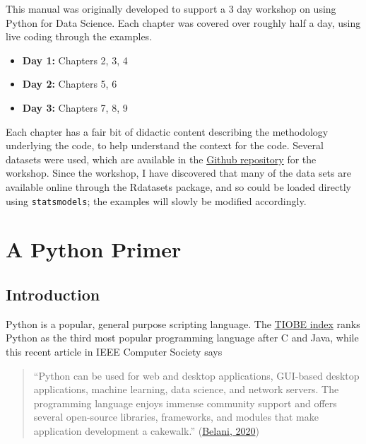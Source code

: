 \documentclass[
  letterpaper,
]{scrbook}
\providecommand{\tightlist}{%
  \setlength{\itemsep}{0pt}\setlength{\parskip}{0pt}}
\begin{document}
This manual was originally developed to support a 3 day workshop on using Python for Data Science. Each chapter was covered over roughly half a day, using live coding through the examples.

\begin{itemize}
\tightlist
\item
  \textbf{Day 1: } Chapters 2, 3, 4
\item
  \textbf{Day 2: } Chapters 5, 6
\item
  \textbf{Day 3: } Chapters 7, 8, 9
\end{itemize}

Each chapter has a fair bit of didactic content describing
the methodology underlying the code, to help understand the
context for the code. Several datasets were used, which are
available in the \href{https://www.github.com/araastat/BIOF085.git}{Github repository} for the workshop. Since the workshop, I have discovered that many
of the data sets are available online through the Rdatasets package, and so could be loaded directly using \texttt{statsmodels}; the examples will slowly be modified accordingly.

\hypertarget{a-python-primer}{%
\chapter{A Python Primer}\label{a-python-primer}}

\hypertarget{introduction}{%
\section{Introduction}\label{introduction}}

Python is a popular, general purpose scripting language. The \href{https://www.tiobe.com/tiobe-index/}{TIOBE index} ranks Python as the third most popular programming language after C and Java, while this recent article in IEEE Computer Society says

\begin{quote}
``Python can be used for web and desktop applications, GUI-based desktop applications, machine learning, data science, and network servers. The programming language enjoys immense community support and offers several open-source libraries, frameworks, and modules that make application development a cakewalk.'' (\href{https://www.computer.org/publications/tech-news/trends/programming-languages-you-should-learn-in-2020}{Belani, 2020})
\end{quote}
\end{document}
